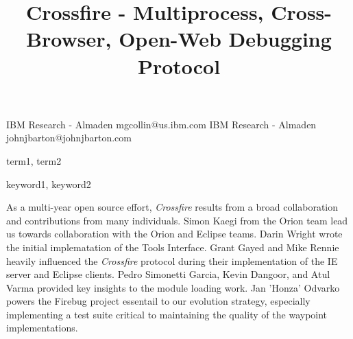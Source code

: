 \documentclass[preprint, 10pt]{sigplanconf}
\begin{document}
\copyrightdata{[to be supplied]}


\title{Crossfire - Multiprocess, Cross-Browser, Open-Web Debugging Protocol}


           {IBM Research - Almaden}
           {mgcollin@us.ibm.com}
           {IBM Research - Almaden}
           {johnjbarton@johnjbarton.com}

\maketitle




\terms
term1, term2

\keywords
keyword1, keyword2



%








\acks
As a multi-year open source effort, \textit{Crossfire} results from a broad collaboration and 
contributions from many individuals. Simon Kaegi from the Orion team lead us towards collaboration with the Orion and Eclipse teams. Darin Wright wrote the initial implematation of the Tools Interface. Grant Gayed and Mike Rennie heavily influenced the \textit{Crossfire} protocol during their implementation of the IE server and Eclipse clients. Pedro Simonetti Garcia, Kevin Dangoor, and Atul Varma provided key insights to the module loading work. Jan 'Honza' Odvarko powers the Firebug project essentail to our evolution strategy, especially implementing a test suite critical to maintaining the quality of the waypoint implementations.








\end{document}

